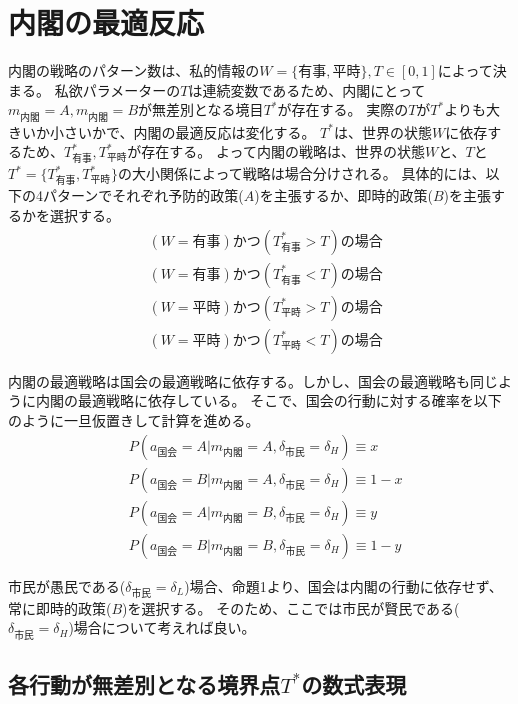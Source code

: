 \documentclass[main.tex]{subfiles}
\begin{document}
\section{内閣の最適反応}



内閣の戦略のパターン数は、私的情報の$W=\lbrace 有事, 平時\rbrace, T\in[0,1]$によって決まる。
私欲パラメーターの$T$は連続変数であるため、内閣にとって$m_{内閣}=A,m_{内閣}=B$が無差別となる境目$T^*$が存在する。
実際の$T$が$T^*$よりも大きいか小さいかで、内閣の最適反応は変化する。
$T^*$は、世界の状態$W$に依存するため、$T^*_{有事}, T^*_{平時}$が存在する。
よって内閣の戦略は、世界の状態$W$と、$T$と$T^* = \lbrace T^*_{有事}, T^*_{平時} \rbrace$の大小関係によって戦略は場合分けされる。
具体的には、以下の4パターンでそれぞれ予防的政策($A$)を主張するか、即時的政策($B$)を主張するかを選択する。
\begin{align*}
    & (W=有事) かつ (T^*_{有事}>T) の場合 \\
    & (W=有事) かつ (T^*_{有事}<T) の場合 \\
    & (W=平時) かつ (T^*_{平時}>T) の場合 \\
    & (W=平時) かつ (T^*_{平時}<T) の場合 
\end{align*}


内閣の最適戦略は国会の最適戦略に依存する。しかし、国会の最適戦略も同じように内閣の最適戦略に依存している。
そこで、国会の行動に対する確率を以下のように一旦仮置きして計算を進める。
\begin{align*}
    & P(a_{国会} = A| m_{内閣} = A, \delta_{市民} = \delta_H ) \equiv x \\
    & P(a_{国会} = B| m_{内閣} = A, \delta_{市民} = \delta_H ) \equiv 1-x \\
    & P(a_{国会} = A| m_{内閣} = B, \delta_{市民} = \delta_H ) \equiv y \\
    & P(a_{国会} = B| m_{内閣} = B, \delta_{市民} = \delta_H ) \equiv 1-y
\end{align*}

市民が愚民である($\delta_{市民}=\delta_L$)場合、命題1より、国会は内閣の行動に依存せず、常に即時的政策($B$)を選択する。
そのため、ここでは市民が賢民である($\delta_{市民}=\delta_H$)場合について考えれば良い。




\subsection{各行動が無差別となる境界点$T^*$の数式表現}
\end{document}
